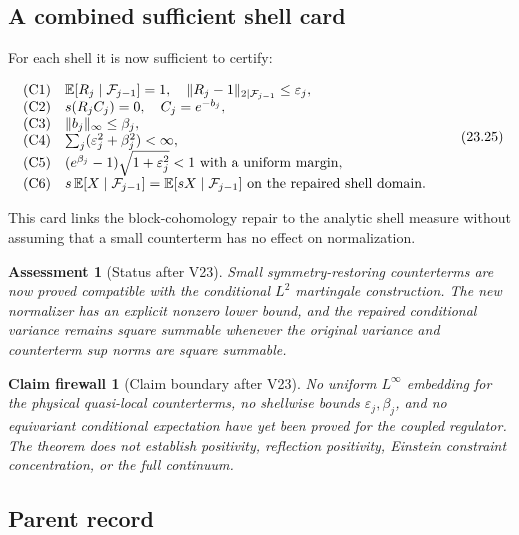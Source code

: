 \documentclass[11pt]{article}
\newtheorem{firewall}[theorem]{Claim firewall}
\newtheorem{assessment}[theorem]{Assessment}
\theoremstyle{remark}
\begin{document}
\subsection{A combined sufficient shell card}

For each shell it is now sufficient to certify:

\[
\begin{array}{ll}
\text{(C1)}&
 {\mathbb E}[R_j\mid{\cal F}_{j-1}]=1,\quad
 \|R_j-1\|_{2\mid{\cal F}_{j-1}}\le\varepsilon_j,\\
\text{(C2)}&
 s(R_jC_j)=0,\quad C_j=e^{-b_j},\\
\text{(C3)}&
 \|b_j\|_\infty\le\beta_j,\\
\text{(C4)}&
 \sum_j(\varepsilon_j^2+\beta_j^2)<\infty,\\
\text{(C5)}&
 (e^{\beta_j}-1)\sqrt{1+\varepsilon_j^2}<1
 \text{ with a uniform margin},\\
\text{(C6)}&
 s\,{\mathbb E}[X\mid{\cal F}_{j-1}]
 =
 {\mathbb E}[sX\mid{\cal F}_{j-1}]
 \text{ on the repaired shell domain}.
\end{array}                                                   \tag{23.25}
\]

This card links the block-cohomology repair to the analytic shell
measure without assuming that a small counterterm has no effect on
normalization.

\begin{assessment}[Status after V23]
\label{ass:v12v23-status}
Small symmetry-restoring counterterms are now proved compatible with
the conditional \(L^2\) martingale construction.  The new normalizer
has an explicit nonzero lower bound, and the repaired conditional
variance remains square summable whenever the original variance and
counterterm sup norms are square summable.
\end{assessment}

\begin{firewall}[Claim boundary after V23]
\label{fire:v12v23-claim}
No uniform \(L^\infty\) embedding for the physical quasi-local
counterterms, no shellwise bounds \(\varepsilon_j,\beta_j\), and no
equivariant conditional expectation have yet been proved for the
coupled regulator.  The theorem does not establish positivity,
reflection positivity, Einstein constraint concentration, or the
full continuum.
\end{firewall}

\subsection{Parent record}
\end{document}
